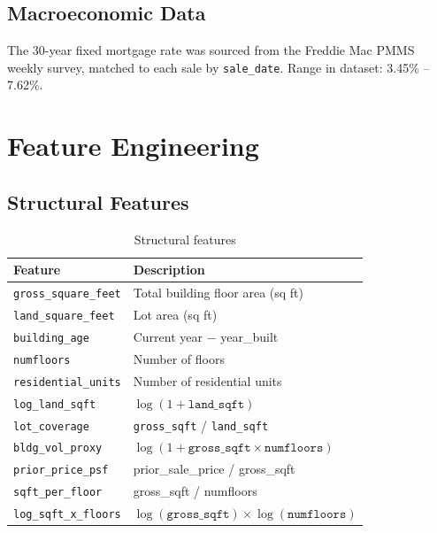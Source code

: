 \documentclass[11pt, a4paper, twoside]{article}
\begin{document}
\subsection{Macroeconomic Data}
The 30-year fixed mortgage rate was sourced from the Freddie Mac PMMS weekly
survey, matched to each sale by \texttt{sale\_date}. Range in dataset:
3.45\% -- 7.62\%.

\section{Feature Engineering}
\label{sec:features}

\subsection{Structural Features}
\begin{table}[H]
  \centering
  \caption{Structural features}
  \label{tab:structural}
  \begin{tabular}{ll}
    \toprule
    Feature & Description \\
    \midrule
    \texttt{gross\_square\_feet} & Total building floor area (sq ft) \\
    \texttt{land\_square\_feet}  & Lot area (sq ft) \\
    \texttt{building\_age}       & Current year $-$ year\_built \\
    \texttt{numfloors}           & Number of floors \\
    \texttt{residential\_units}  & Number of residential units \\
    \texttt{log\_land\_sqft}     & $\log(1+\texttt{land\_sqft})$ \\
    \texttt{lot\_coverage}       & \texttt{gross\_sqft} / \texttt{land\_sqft} \\
    \texttt{bldg\_vol\_proxy}    & $\log(1+\texttt{gross\_sqft}\times\texttt{numfloors})$ \\
    \texttt{prior\_price\_psf}   & prior\_sale\_price / gross\_sqft \\
    \texttt{sqft\_per\_floor}    & gross\_sqft / numfloors \\
    \texttt{log\_sqft\_x\_floors}& $\log(\texttt{gross\_sqft})\times\log(\texttt{numfloors})$ \\
    \bottomrule
  \end{tabular}
\end{table}
\end{document}
